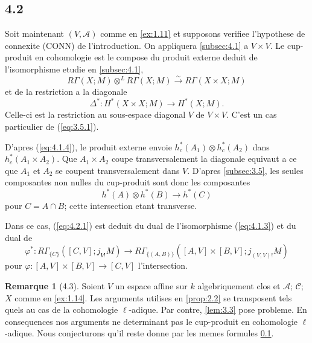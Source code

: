 \documentclass[11pt,a4paper]{article}
\theoremstyle{plain}
\theoremstyle{definition}
\newtheorem{remark}[theorem]{Remarque}
\begin{document}
\subsection{4.2}\label{subsec:4.2}

Soit maintenant $(V,\mathcal{A})$ comme en \ref{ex:1.11} et supposons verifiee l'hypothese de connexite (CONN) de l'introduction. On appliquera \ref{subsec:4.1} a $V \times V$. Le cup-produit en cohomologie est le compose du produit externe deduit de l'isomorphisme etudie en \ref{subsec:4.1},
\[R\Gamma(X;M) \otimes^L R\Gamma(X;M) \xrightarrow{\sim} R\Gamma(X \times X;M)\]
et de la restriction a la diagonale
\[\Delta^*: H^*(X \times X;M) \longrightarrow H^*(X;M).\]
Celle-ci est la restriction au sous-espace diagonal $V$ de $V \times V$. C'est un cas particulier de (\ref{eq:3.5.1}).

D'apres (\ref{eq:4.1.4}), le produit externe envoie $h^*_c(A_1) \otimes h^*_c(A_2)$ dans $h^*_c(A_1 \times A_2)$. Que $A_1 \times A_2$ coupe transversalement la diagonale equivaut a ce que $A_1$ et $A_2$ se coupent transversalement dans $V$. D'apres \ref{subsec:3.5}, les seules composantes non nulles du cup-produit sont donc les composantes
\begin{equation}\label{eq:4.2.1}
h^*(A) \otimes h^*(B) \longrightarrow h^*(C)
\tag{4.2.1}
\end{equation}
pour $C = A \cap B$; cette intersection etant transverse.

Dans ce cas, (\ref{eq:4.2.1}) est deduit du dual de l'isomorphisme (\ref{eq:4.1.3}) et du dual de
\[\varphi^*: R\Gamma_{\{C\}}([C,V];j_{V!}M) \longrightarrow R\Gamma_{\{(A,B)\}}([A,V] \times [B,V];j_{(V,V)!}M)\]
pour $\varphi: [A,V] \times [B,V] \to [C,V]$ l'intersection.

\begin{remark}[4.3]\label{rem:4.3}
Soient $V$ un espace affine sur $k$ algebriquement clos et $\mathcal{A}$; $\mathcal{C}$; $X$ comme en \ref{ex:1.14}. Les arguments utilises en \ref{prop:2.2} se transposent tels quels au cas de la cohomologie $\ell$-adique. Par contre, \ref{lem:3.3} pose probleme. En consequences nos arguments ne determinant pas le cup-produit en cohomologie $\ell$-adique. Nous conjecturons qu'il reste donne par les memes formules \ref{subsec:4.2}.
\end{remark}
\end{document}
